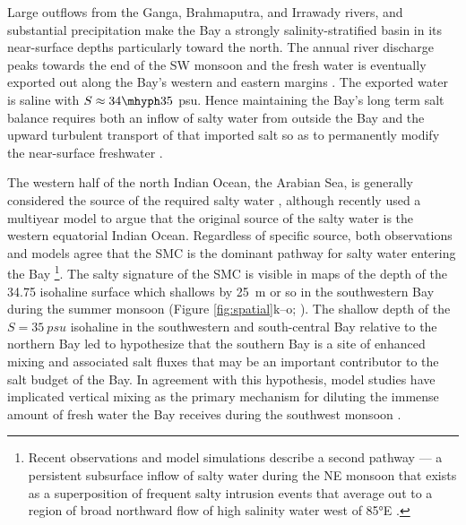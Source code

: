 \documentclass[onecol]{ametsoc}
\begin{document}
Large outflows from the Ganga, Brahmaputra, and Irrawady rivers, and substantial precipitation make the Bay a strongly salinity-stratified basin in its near-surface depths particularly toward the north. The annual river discharge peaks towards the end of the SW monsoon and the fresh water is eventually exported out along the Bay's western and eastern margins \citep{Sengupta2006}. The exported water is saline with \(S \approx 34 \mhyph 35\) \si{psu}. Hence maintaining the Bay's long term salt balance requires both an inflow of salty water from outside the Bay and the upward turbulent transport of that imported salt so as to permanently modify the near-surface freshwater \citep{Vinayachandran2013}.

The western half of the north Indian Ocean, the Arabian Sea, is generally considered the source of the required salty water \citep[for example, ][]{Jensen2001}, although recently \cite{Sanchez-Franks2019} used a multiyear model to argue that the original source of the salty water is the western equatorial Indian Ocean. Regardless of specific source, both observations and models agree that the SMC is the dominant pathway for salty water entering the Bay \citep{Jensen2001,Vinayachandran2013,Webber2018}\footnote{Recent observations and model simulations describe a second pathway — a persistent subsurface inflow of salty water during the NE monsoon that exists as a superposition of frequent salty intrusion events that average out to a region of broad northward flow of high salinity water west of 85°E \citep{Wijesekera2015,Jensen2016}.}.
The salty signature of the SMC is visible in maps of the depth of the 34.75 isohaline surface which shallows by \SI{25}{m} or so in the southwestern Bay during the summer monsoon (Figure \ref{fig:spatial}k--o; \citealp{Murty1992a,Vinayachandran2013}).
The shallow depth of the \(S = \SI{35}{psu}\) isohaline in the southwestern and south-central Bay relative to the northern Bay led \cite{Vinayachandran2013} to hypothesize that the southern Bay is a site of enhanced mixing and associated salt fluxes that may be an important contributor to the salt budget of the Bay.
In agreement with this hypothesis, model studies have implicated vertical mixing as the primary mechanism for diluting the immense amount of fresh water the Bay receives during the southwest monsoon \citep{Akhil2014,Benshila2014,Wilson2016a}.

\end{document}
